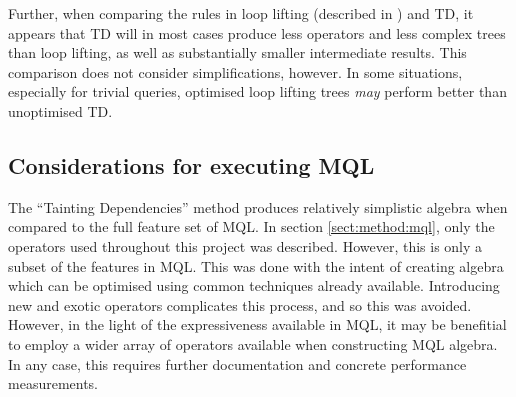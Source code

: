 Further, when comparing the rules in loop lifting (described in
\cite{pathfinder_mothertongue}) and TD, it appears that TD will in most cases
produce less operators and less complex trees than loop lifting, as well as
substantially smaller intermediate results. This comparison does not consider
simplifications, however. In some situations, especially for trivial queries,
optimised loop lifting trees \emph{may} perform better than unoptimised TD. 

\subsection{Considerations for executing MQL}
The ``Tainting Dependencies'' method produces relatively simplistic algebra
when compared to the full feature set of MQL. In section \ref{sect:method:mql},
only the operators used throughout this project was described. However, this is
only a subset of the features in MQL. This was done with the intent of creating
algebra which can be optimised using common techniques already available.
Introducing new and exotic operators complicates this process, and so this was
avoided. However, in the light of the expressiveness available in MQL, it may
be benefitial to employ a wider array of operators available when constructing
MQL algebra. In any case, this requires further documentation and concrete
performance measurements.